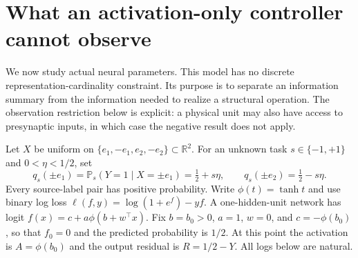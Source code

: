 \section{What an activation-only controller cannot observe}
\label{sec:activation-observation}

We now study actual neural parameters. This model has no discrete
representation-cardinality constraint. Its purpose is to separate an
information summary from the information needed to realize a structural
operation. The observation restriction below is explicit: a physical unit
may also have access to presynaptic inputs, in which case the negative
result does not apply.

Let $X$ be uniform on $\{e_1,-e_1,e_2,-e_2\}\subset\mathbb R^2$.
For an unknown task $s\in\{-1,+1\}$ and $0<\eta<1/2$, set
\[
 q_s(\pm e_1)=\mathbb P_s(Y=1\mid X=\pm e_1)=\tfrac12+s\eta,
 \qquad q_s(\pm e_2)=\tfrac12-s\eta.
\]
Every source-label pair has positive probability. Write
$\phi(t)=\tanh t$ and use binary log loss
$\ell(f,y)=\log(1+e^f)-yf$. A one-hidden-unit network has logit
$f(x)=c+a\phi(b+w^\top x)$. Fix $b=b_0>0$, $a=1$, $w=0$, and
$c=-\phi(b_0)$, so that $f_0=0$ and the predicted probability is $1/2$.
At this point the activation is $A=\phi(b_0)$ and the output residual is
$R=1/2-Y$. All logs below are natural.

